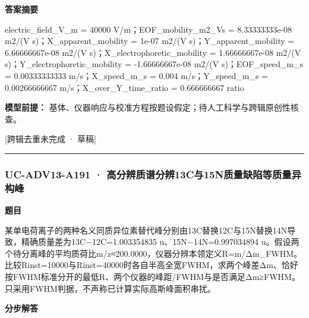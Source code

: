 \documentclass[UTF8,11pt,a4paper]{ctexart}
\begin{document}
\noindent\textbf{答案摘要}\par
electric\_field\_V\_m = 40000 V/m；EOF\_mobility\_m2\_Vs = 8.33333333e-08 m2/(V s)；X\_apparent\_mobility = 1e-07 m2/(V s)；Y\_apparent\_mobility = 6.66666667e-08 m2/(V s)；X\_electrophoretic\_mobility = 1.66666667e-08 m2/(V s)；Y\_electrophoretic\_mobility = -1.66666667e-08 m2/(V s)；EOF\_speed\_m\_s = 0.00333333333 m/s；X\_speed\_m\_s = 0.004 m/s；Y\_speed\_m\_s = 0.00266666667 m/s；X\_over\_Y\_time\_ratio = 0.666666667 ratio\par
\noindent\textbf{模型前提：}
基体、仪器响应与校准方程按题设假定；待人工科学与跨辑原创性核查。\par
\noindent\textcolor{red!65!black}{[跨辑去重未完成 · 草稿]} \par
\medskip\hrule\medskip
{}
\subsubsection*{UC-ADV13-A191 · 高分辨质谱分辨13C与15N质量缺陷等质量异构峰}
\noindent\textbf{题目}\par
某单电荷离子的两种名义同质异位素替代峰分别由13C替换12C与15N替换14N导致，精确质量差为13C−12C=1.003354835 u、15N−14N=0.997034894 u。假设两个待分离峰的平均质荷比m/z≈200.0000，仪器分辨本领定义R=m/Δm\_FWHM。比较Rinst=10000与Rinst=40000时各自半高全宽FWHM，求两个峰差Δm、恰好按FWHM标准分开的最低R、两个仪器的峰距/FWHM与是否满足Δm≥FWHM。只采用FWHM判据，不声称已计算实际高斯峰面积串扰。\par
\medskip\noindent\textbf{分步解答}
\end{document}
